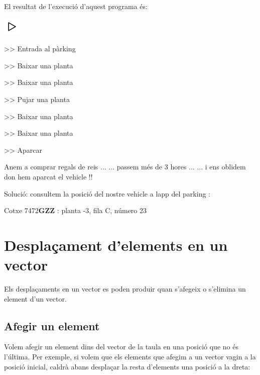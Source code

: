 \documentclass[
]{book}
\newenvironment{Shaded}{\begin{snugshade}}{\end{snugshade}}
\newcommand{\DecValTok}[1]{\textcolor[rgb]{0.00,0.00,0.81}{#1}}
\newcommand{\ErrorTok}[1]{\textcolor[rgb]{0.64,0.00,0.00}{\textbf{#1}}}
\newcommand{\NormalTok}[1]{#1}
\begin{document}
El resultat de l'execució d'aquest programa és:

\includegraphics{./img/play.png}

\begin{Shaded}
\begin{Highlighting}[]
\NormalTok{\textgreater{}\textgreater{} Entrada al pàrking }

\NormalTok{\textgreater{}\textgreater{} Baixar una planta}

\NormalTok{\textgreater{}\textgreater{} Baixar una planta}

\NormalTok{\textgreater{}\textgreater{} Pujar una planta}

\NormalTok{\textgreater{}\textgreater{} Baixar una planta}

\NormalTok{\textgreater{}\textgreater{} Baixar una planta}

\NormalTok{\textgreater{}\textgreater{} Aparcar}

\NormalTok{Anem a comprar regals de reis ...}
\NormalTok{... passem més de }\DecValTok{3}\NormalTok{ hores ...}
\NormalTok{... i ens oblidem d\textquotesingle{}on hem aparcat el vehicle !!}

\NormalTok{Solució: consultem la posició del nostre vehicle }
\NormalTok{a l\textquotesingle{}app del parking : }

\NormalTok{Cotxe }\DecValTok{7472}\ErrorTok{GZZ}\NormalTok{ : planta {-}}\DecValTok{3}\NormalTok{, fila C, número }\DecValTok{23}
\end{Highlighting}
\end{Shaded}

\hypertarget{desplauxe7ament-delements-en-un-vector}{%
\section{Desplaçament d'elements en un vector}\label{desplauxe7ament-delements-en-un-vector}}

Els desplaçaments en un vector es poden produir quan s'afegeix o s'elimina un element d'un vector.

\hypertarget{afegir-un-element}{%
\subsection{Afegir un element}\label{afegir-un-element}}

Volem afegir un element dins del vector de la taula en una posició que no és l'última. Per exemple, si volem que els elements que afegim a un vector vagin a la posició inicial, caldrà abans desplaçar la resta d'elements una posició a la dreta:
\end{document}
